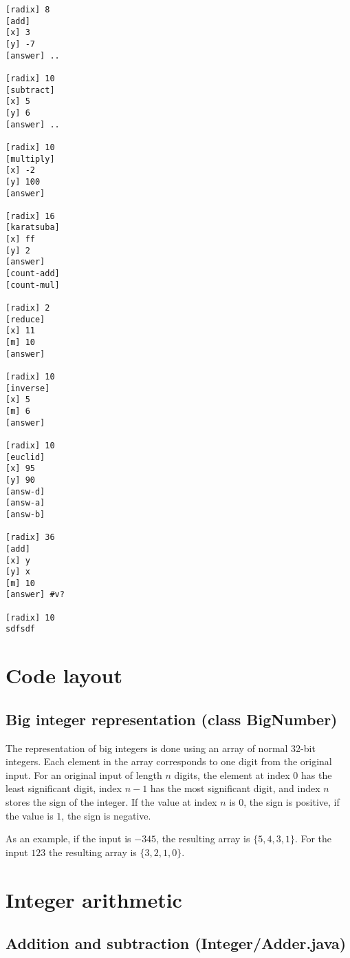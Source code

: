 \documentclass[a4paper]{article}
\begin{document}
\begin{verbatim}
[radix] 8
[add]
[x] 3
[y] -7
[answer] ..

[radix] 10
[subtract]
[x] 5
[y] 6
[answer] ..

[radix] 10
[multiply]
[x] -2
[y] 100
[answer]

[radix] 16
[karatsuba]
[x] ff
[y] 2
[answer]
[count-add]
[count-mul]

[radix] 2
[reduce]
[x] 11
[m] 10
[answer]

[radix] 10
[inverse]
[x] 5
[m] 6
[answer]

[radix] 10
[euclid]
[x] 95
[y] 90
[answ-d]
[answ-a]
[answ-b]

[radix] 36
[add]
[x] y
[y] x
[m] 10
[answer] #v?

[radix] 10
sdfsdf

\end{verbatim}



\section{Code layout}

\subsection{Big integer representation (class BigNumber)}

The representation of big integers is done using an array of normal 32-bit integers.
Each element in the array corresponds to one digit from the original input.
For an original input of length $n$ digits, the element at index $0$ has the least significant digit,
index $n-1$ has the most significant digit, and index $n$ stores the sign of the integer.
If the value at index $n$ is 0, the sign is positive, if the value is $1$, the sign is negative.

As an example, if the input is $-345$, the resulting array is $\{5, 4, 3, 1\}$.
For the input $123$ the resulting array is $\{3, 2, 1, 0\}$.


\section{Integer arithmetic}

\subsection{Addition and subtraction (Integer/Adder.java)}
\end{document}
